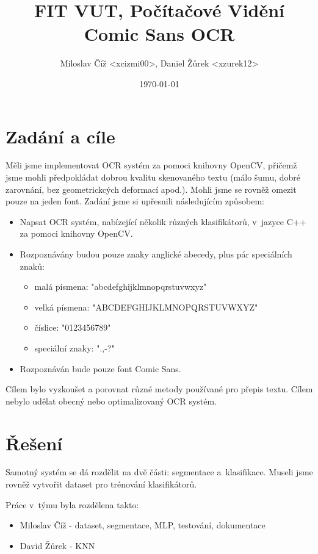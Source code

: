 \documentclass[12pt]{article}
\title{FIT VUT, Počítačové Vidění\\Comic Sans OCR}
\author{Miloslav Číž <xcizmi00>, Daniel Žůrek <xzurek12>}
\date{\today}
\begin{document}
\maketitle

\section{Zadání a cíle}

Měli jsme implementovat OCR systém za pomoci knihovny OpenCV, přičemž jsme mohli
předpokládat dobrou kvalitu skenovaného textu (málo šumu, dobré zarovnání, bez geometrickcých
deformací apod.). Mohli jsme se rovněž omezit pouze na jeden font. Zadání jsme si upřesnili
následujícím způsobem:

\begin{itemize}
  \item Napsat OCR systém, nabízející několik různých klasifikátorů, v~jazyce C++ za pomoci knihovny OpenCV.
  \item Rozpoznávány budou pouze znaky anglické abecedy, plus pár speciálních znaků:
  \begin{itemize}
    \item malá písmena: "abcdefghijklmnopqrstuvwxyz"
    \item velká písmena: "ABCDEFGHIJKLMNOPQRSTUVWXYZ"
    \item číslice: "0123456789"
    \item speciální znaky: ".,-?"
  \end{itemize}
  \item Rozpoznáván bude pouze font Comic Sans.
\end{itemize}

Cílem bylo vyzkoušet a porovnat různé metody používané pro přepis textu. Cílem nebylo udělat
obecný nebo optimalizovaný OCR systém.


\section{Řešení}

Samotný systém se dá rozdělit na dvě části: segmentace a~klasifikace. Museli jsme rovněž vytvořit
dataset pro trénování klasifikátorů.

Práce v~týmu byla rozdělena takto:

\begin{itemize}
  \item Miloslav Číž - dataset, segmentace, MLP, testování, dokumentace 
  \item David Žůrek - KNN
\end{itemize}
\end{document}

